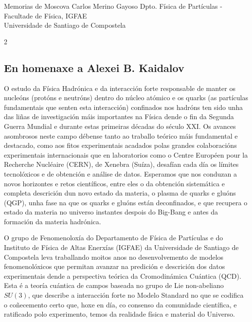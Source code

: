 \Titular*%
{profesorado}%
{Memorias de Moscova}%
{Carlos Merino Gayoso}%
{Dpto. Física de Partículas - Facultade de Física, IGFAE\\ Universidade de Santiago de Compostela}%

\begin{multicols}{2}

\subsection*{En homenaxe a Alexei B. Kaidalov}

O estudo da Física Hadrónica e da interacción forte responsable de manter os
nucleóns (protóns e neutróns) dentro do núcleo atómico e os quarks (as
partículas fundamentais que senten esta interacción) confinados nos hadróns ten
sido unha das liñas de investigación máis importantes na Física dende o fin da
Segunda Guerra Mundial e durante estas primeiras décadas do século XXI. Os
avances asombrosos neste campo débense tanto ao traballo teórico máis
fundamental e destacado, como aos fitos experimentais acadados polas grandes
colaboracións experimentais internacionais que en laboratorios como o Centre
Européen pour la Recherche Nucléaire (CERN), de Xenebra (Suíza), desafían cada
día os límites tecnolóxicos e de obtención e análise de datos. Esperamos que
nos conduzan a novos horizontes e retos científicos, entre eles o da obtención
sistemática e completa descrición dun novo estado da materia, o plasma de
quarks e gluóns (QGP), unha fase na que os quarks e gluóns están deconfinados,
e que recupera o estado da materia no universo instantes despois do Big-Bang e
antes da formación da materia hadrónica.

O grupo de Fenomenoloxía do Departamento de Física de Partículas e do Instituto
de Física de Altas Enerxías (IGFAE) da Universidade de Santiago de Compostela
leva traballando moitos anos no desenvolvemento de modelos fenomenolóxicos que
permitan avanzar na predición e descrición dos datos experimentais dende a
perspectiva teórica da Cromodinámica Cuántica (QCD). Esta é a teoría cuántica
de campos baseada no grupo de Lie non-abeliano $SU(3)$, que describe a
interacción forte no Modelo Standard no que se codifica o coñecemento certo
que, hoxe en día, co consenso da comunidade científica, e ratificado polo
experimento, temos da realidade física e material do Universo.


\end{multicols}
